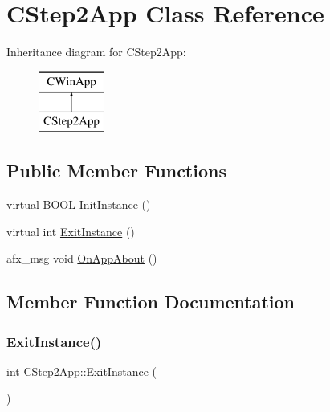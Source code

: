 \hypertarget{class_c_step2_app}{}\section{C\+Step2\+App Class Reference}
\label{class_c_step2_app}
Inheritance diagram for C\+Step2\+App\+:\begin{figure}[H]
\begin{center}
\leavevmode
\includegraphics[height=2.000000cm]{class_c_step2_app}
\end{center}
\end{figure}
\subsection*{Public Member Functions}
\begin{DoxyCompactItemize}
\item 
virtual B\+O\+OL \mbox{\hyperlink{class_c_step2_app_a4152bf861e6e520eaa173c41a3d9f73d}{Init\+Instance}} ()
\item 
virtual int \mbox{\hyperlink{class_c_step2_app_aad455705e63bb9ae0642be6ca2d2b684}{Exit\+Instance}} ()
\item 
afx\+\_\+msg void \mbox{\hyperlink{class_c_step2_app_a7407f02b1d0628458512c9f35ab2bb50}{On\+App\+About}} ()
\end{DoxyCompactItemize}


\subsection{Member Function Documentation}
\mbox{\label{class_c_step2_app_aad455705e63bb9ae0642be6ca2d2b684}} 
\subsubsection{\texorpdfstring{Exit\+Instance()}{ExitInstance()}}
{\footnotesize\ttfamily int C\+Step2\+App\+::\+Exit\+Instance (\begin{DoxyParamCaption}{ }\end{DoxyParamCaption})\hspace{0.3cm}{\ttfamily [virtual]}}

